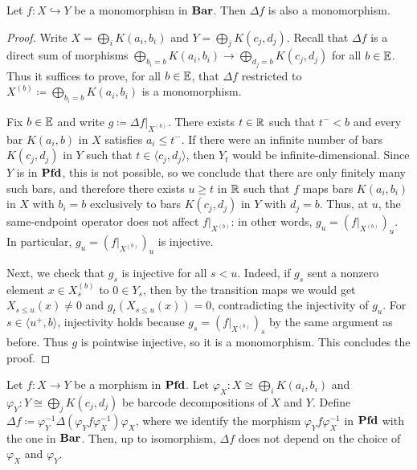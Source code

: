 \begin{proposition}
  Let $f \colon X \hookrightarrow Y$ be a monomorphism in $\Bar$. Then $\Delta f$ is also a monomorphism.
\end{proposition}

\begin{proof}
  Write $X = \bigoplus_i K(a_i, b_i)$ and $Y = \bigoplus_j K(c_j, d_j)$. Recall that $\Delta f$ is a direct sum of morphisms $\bigoplus_{b_i = b} K(a_i, b_i) \to \bigoplus_{d_j = b} K(c_j, d_j)$ for all $b \in \bb{E}$. Thus it suffices to prove, for all $b \in \bb{E}$, that $\Delta f$ restricted to $X^{(b)} \coloneq \bigoplus_{b_i = b} K(a_i, b_i)$ is a monomorphism.

  Fix $b \in \bb{E}$ and write $g \coloneq \Delta f|_{X^{(b)}}$. There exists $t \in \bb{R}$ such that $t^- < b$ and every bar $K(a_i, b)$ in $X$ satisfies $a_i \leq t^-$.
  If there were an infinite number of bars $K(c_j, d_j)$ in $Y$ such that $t \in \langle c_j, d_j \rangle$, then $Y_t$ would be infinite-dimensional. Since $Y$ is in $\Pfd$, this is not possible, so we conclude that there are only finitely many such bars, and therefore there exists $u \geq t$ in $\bb{R}$ such that $f$ maps bars $K(a_i, b_i)$ in $X$ with $b_i = b$ exclusively to bars $K(c_j, d_j)$ in $Y$ with $d_j = b$. Thus, at $u$, the same-endpoint operator does not affect $f|_{X^{(b)}}$: in other words, $g_u = (f|_{X^{(b)}})_u$. In particular, $g_u = (f|_{X^{(b)}})_u$ is injective.

  Next, we check that $g_s$ is injective for all $s < u$. Indeed, if $g_s$ sent a nonzero element $x \in X^{(b)}_s$ to $0 \in Y_s$, then by the transition maps we would get $X_{s \leq u}(x) \neq 0$ and $g_t(X_{s \leq u}(x)) = 0$, contradicting the injectivity of $g_u$. For $s \in \langle u^+, b \rangle$, injectivity holds because $g_s = (f|_{X^{(b)}})_s$ by the same argument as before. Thus $g$ is pointwise injective, so it is a monomorphism. This concludes the proof.
\end{proof}

\begin{proposition}
\label{C!prop:pfd-def-Df}
  Let $f \colon X \to Y$ be a morphism in $\Pfd$. Let $\varphi_X \colon X \cong \bigoplus_i K(a_i, b_i)$ and $\varphi_Y \colon Y \cong \bigoplus_j K(c_j, d_j)$ be barcode decompositions of $X$ and $Y$. Define $\Delta f \coloneq \varphi_Y^{-1} \Delta(\varphi_Y f \varphi_X^{-1}) \varphi_X$, where we identify the morphism $\varphi_Y f \varphi_X^{-1}$ in $\Pfd$ with the one in $\Bar$. Then, up to isomorphism, $\Delta f$ does not depend on the choice of $\varphi_X$ and $\varphi_Y$.
\end{proposition}

